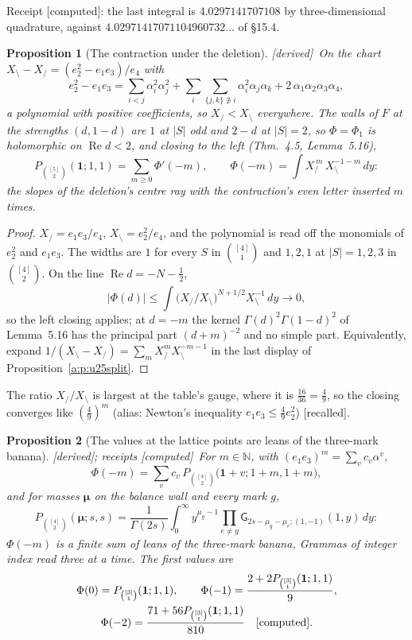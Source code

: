 \documentclass[11pt]{article}
\newcommand{\one}{\mathbf 1}
\newcommand{\bmu}{\boldsymbol\mu}
\newcommand{\sG}{\mathsf G}
\DeclareMathOperator{\re}{Re}
\theoremstyle{plain}
\newtheorem{proposition}{Proposition}[section]
\theoremstyle{definition}
\theoremstyle{remark}
\newcommand{\derived}{\textup{[derived]}}
\newcommand{\computed}{\textup{[computed]}}
\newcommand{\recalled}{\textup{[recalled]}}
\begin{document}
\noindent Receipt \computed: the last integral is $4.0297141707108$ by three-dimensional quadrature, against $4.02971417071104960732\ldots$ of \S15.4.

\begin{proposition}[The contraction under the deletion]\label{a:p:under}\derived\
On the chart $X_{\setminus}-X_{/}=(e_2^2-e_1e_3)/e_4$ with
\[
e_2^2-e_1e_3=\sum_{i<j}\alpha_i^2\alpha_j^2+\sum_i\sum_{\{j,k\}\not\ni i}\alpha_i^2\alpha_j\alpha_k+2\,\alpha_1\alpha_2\alpha_3\alpha_4,
\]
a polynomial with positive coefficients, so $X_{/}<X_{\setminus}$ everywhere. The walls of $F$ at the strengths $(d,1-d)$ are $1$ at $|S|$ odd and $2-d$ at $|S|=2$, so $\Phi=\Phi_1$ is holomorphic on $\re d<2$, and closing to the left (Thm.~4.5, Lemma~5.16),
\[
P_{\binom{[5]}2}(\one;1,1)=\sum_{m\ge0}\Phi'(-m),\qquad \Phi(-m)=\int X_{/}^{\,m}\,X_{\setminus}^{-1-m}\,dy :
\]
the slopes of the deletion's centre ray with the contraction's even letter inserted $m$ times.
\end{proposition}

\begin{proof}
$X_{/}=e_1e_3/e_4$, $X_{\setminus}=e_2^2/e_4$, and the polynomial is read off the monomials of $e_2^2$ and $e_1e_3$. The widths are $1$ for every $S$ in $\binom{[4]}1$ and $1,2,1$ at $|S|=1,2,3$ in $\binom{[4]}2$. On the line $\re d=-N-\frac12$,
\[
|\Phi(d)|\le\int\big(X_{/}/X_{\setminus}\big)^{N+1/2}X_{\setminus}^{-1}\,dy\to0,
\]
so the left closing applies; at $d=-m$ the kernel $\Gamma(d)^2\Gamma(1-d)^2$ of Lemma~5.16 has the principal part $(d+m)^{-2}$ and no simple part. Equivalently, expand $1/(X_{\setminus}-X_{/})=\sum_mX_{/}^mX_{\setminus}^{-m-1}$ in the last display of Proposition~\ref{a:p:u25split}.
\end{proof}

The ratio $X_{/}/X_{\setminus}$ is largest at the table's gauge, where it is $\frac{16}{36}=\frac49$, so the closing converges like $(\frac49)^m$ (alias: Newton's inequality $e_1e_3\le\frac49e_2^2$) \recalled.

\begin{proposition}[The values at the lattice points are leans of the three-mark banana]\label{a:p:leans}\derived; receipts \computed\
For $m\in\mathbb N$, with $(e_1e_3)^m=\sum_vc_v\alpha^v$,
\[
\Phi(-m)=\sum_vc_v\,P_{\binom{[4]}2}\big(\one+v;1+m,1+m\big),
\]
and for masses $\bmu$ on the balance wall and every mark $g$,
\[
P_{\binom{[4]}2}(\bmu;s,s)=\frac1{\Gamma(2s)}\int_0^\infty y^{\mu_g-1}\prod_{e\neq g}\sG_{2s-\mu_g-\mu_e;(1,-1)}(1,y)\,dy :
\]
$\Phi(-m)$ is a finite sum of leans of the three-mark banana, Grammas of integer index read three at a time. The first values are
\begin{gather*}
\Phi(0)=P_{\binom{[3]}1}(\one;1,1),\qquad \Phi(-1)=\frac{2+2P_{\binom{[3]}1}(\one;1,1)}9,\\
\Phi(-2)=\frac{71+56P_{\binom{[3]}1}(\one;1,1)}{810}\quad\computed .
\end{gather*}
\end{proposition}
\end{document}

